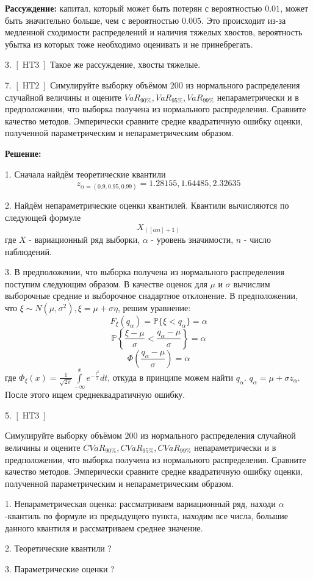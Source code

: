 \documentclass[%
12pt, %
final, %
oneside, %
onecolumn, %
centertags]{article} %
\theoremstyle{plain}
\theoremstyle{definition}
\theoremstyle{remark}
\begin{document}
\textbf{Рассуждение:} капитал, который может быть потерян с вероятностью $0.01$, может быть значительно больше, чем с вероятностью $0.005$. Это происходит из-за медленной сходимости распределений и наличия тяжелых хвостов, вероятность убытка из которых тоже необходимо оценивать и не принебрегать.

3. \([\operatorname{HT3}]\) Такое же рассуждение, хвосты тяжелые.


\newpage

7. \([\operatorname{HT2}]\) Симулируйте выборку объёмом $200$ из нормального распределения случайной величины и оцените $VaR_{90\%}, VaR_{95\%}, VaR_{99\%}$ непараметрически и в предположении, что выборка получена из нормального распределения. Сравните качество методов. Эмперически сравните средне квадратичную ошибку оценки, полученной параметрическим и непараметрическим образом.

\textbf{Решение:}

1. Сначала найдём теоретические квантили
$$z_{\alpha = (0.9, 0.95, 0.99)} = 1.28155, 1.64485, 2.32635$$

2. Найдём непараметрические оценки квантилей. Квантили вычисляются по следующей формуле
$$X_{([\alpha n] + 1)}$$ 
где $X$ - вариационный ряд выборки, $\alpha$ - уровень значимости, $n$ - число наблюдений.

3. В предположении, что выборка получена из нормального распределения поступим следующим образом. В качестве оценок для $\mu$ и $\sigma$ вычислим выборочные средние и выборочное снадартное отклонение. В предположении, что $\xi \sim N(\mu, \sigma^2), \xi = \mu + \sigma \eta$, решим уравнение:
$$F_{\xi}(q_{\alpha}) = \mathbb{P}\{\xi < q_{\alpha}\} = \alpha$$
$$\mathbb{P}\left\{\frac{\xi - \mu}{\sigma} < \frac{q_{\alpha} - \mu}{\sigma}\right\} = \alpha$$
$$\Phi\left(\frac{q_{\alpha} - \mu}{\sigma}\right) = \alpha $$
где $\Phi_{\xi}(x) = \frac{1}{\sqrt{2\pi}} \int\limits_{-\infty}^x e^{-\frac{t^2}{2}}dt$, откуда в принципе можем найти $q_{\alpha}$. $q_{\alpha} = \mu + \sigma z_{\alpha}$. После этого ищем среднеквадратичную ошибку.

\newpage 

5. \([\operatorname{HT3}]\)

Симулируйте выборку объёмом $200$ из нормального распределения случайной величины и оцените $CVaR_{90\%}, CVaR_{95\%}, CVaR_{99\%}$ непараметрически и в предположении, что выборка получена из нормального распределения. Сравните качество методов. Эмперически сравните средне квадратичную ошибку оценки, полученной параметрическим и непараметрическим образом.

1. Непараметрическая оценка: рассматриваем вариационный ряд, находи $\alpha$-квантиль по формуле из предыдущего пункта, находим все числа, большие данного квантиля и рассматриваем среднее значение.

2. Теоретические квантили ?

3. Параметрические оценки ?
\end{document}
